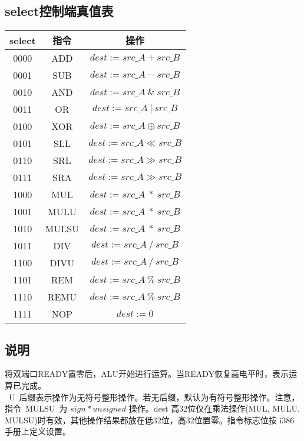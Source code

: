 \subsection{select控制端真值表}
\begin{tabular}{|c|c|c|}
    \hline
    select      &   指令   &      操作\\\hline
    0000        &   ADD     &    ${dest := src\_A + src\_B}$\\\hline
    0001        &   SUB     &    ${dest := src\_A - src\_B}$\\\hline
    0010        &   AND     &    ${dest := src\_A\ \&\ src\_B}$\\\hline
    0011        &   OR     &     ${dest := src\_A\ |\ src\_B}$\\\hline
    0100        &   XOR     &    ${dest := src\_A \oplus src\_B}$\\\hline
    0101        &   SLL     &    ${dest := src\_A \ll src\_B}$\\\hline
    0110        &   SRL     &    ${dest := src\_A \gg src\_B}$\\\hline
    0111        &   SRA     &    ${dest := src\_A \gg src\_B}$\\\hline
    1000        &   MUL     &    ${dest := src\_A\ *\ src\_B}$\\\hline
    1001        &   MULU    &    ${dest := src\_A\ *\ src\_B}$\\\hline
    1010        &   MULSU   &    ${dest := src\_A\ *\ src\_B}$\\\hline
    1011        &   DIV     &    ${dest := src\_A\ /\ src\_B}$\\\hline
    1100        &   DIVU     &   ${dest := src\_A\ /\ src\_B}$\\\hline
    1101        &   REM     &    ${dest := src\_A\ \%\ src\_B}$\\\hline
    1110        &   REMU     &   ${dest := src\_A\ \%\ src\_B}$\\\hline
    1111        &   NOP     &    ${dest := 0}$\\\hline
\end{tabular}
\subsection{说明}
将双端口READY置零后，ALU开始进行运算。当READY恢复高电平时，表示运算已完成。\\
\ U\ 后缀表示操作为无符号整形操作。若无后缀，默认为有符号整形操作。注意，指令\ MULSU\ 为 ${sign * unsigned}$ 操作。dest 高32位仅在乘法操作(MUL, MULU, MULSU)时有效，其他操作结果都放在低32位，高32位置零。指令标志位按 i386 手册上定义设置。


